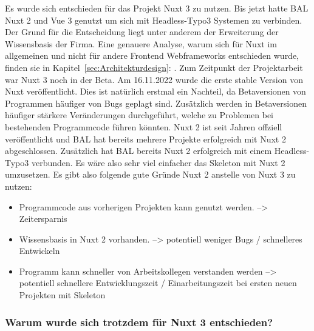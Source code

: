 Es wurde sich entschieden für das Projekt Nuxt 3 zu nutzen. Bis jetzt hatte \acs{BAL} Nuxt 2 und Vue 3 genutzt um sich mit Headless-Typo3 Systemen zu verbinden. Der Grund für die Entscheidung liegt unter anderem der Erweiterung der Wissensbasis der Firma. Eine genauere Analyse, warum sich für Nuxt im allgemeinen und nicht für andere Frontend Webframeworks entschieden wurde, finden sie in Kapitel~\ref{sec:Architekturdesign}: . Zum Zeitpunkt der Projektarbeit war Nuxt 3 noch in der Beta. Am 16.11.2022 wurde die erste stable Version von Nuxt veröffentlicht. Dies ist natürlich erstmal ein Nachteil, da Betaversionen von Programmen häufiger von Bugs geplagt sind. Zusätzlich werden in Betaversionen häufiger stärkere Veränderungen durchgeführt, welche zu Problemen bei bestehenden Programmcode führen könnten. Nuxt 2 ist seit Jahren offziell veröffentlicht und \acs{BAL} hat bereits mehrere Projekte erfolgreich mit Nuxt 2 abgeschlossen. Zusätzlich hat \acs{BAL} bereits Nuxt 2 erfolgreich mit einem Headless-Typo3 verbunden. Es wäre also sehr viel einfacher das Skeleton mit Nuxt 2 umzusetzen. Es gibt also folgende gute Gründe Nuxt 2 anstelle von Nuxt 3 zu nutzen:
\begin{itemize}
	\item Programmcode aus vorherigen Projekten kann genutzt werden. --> Zeitersparnis
	\item Wissensbasis in Nuxt 2 vorhanden. --> potentiell weniger Bugs / schnelleres Entwickeln
	\item Programm kann schneller von Arbeitskollegen verstanden werden --> potentiell schnellere Entwicklungszeit / Einarbeitungszeit bei ersten neuen Projekten mit Skeleton
\end{itemize}

\subsubsection{Warum wurde sich trotzdem für Nuxt 3 entschieden?}
\label{sec:Warum wurde sich trotzdem für Nuxt 3 entschieden?}


